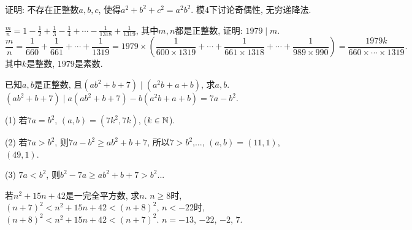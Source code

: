 \bq{}{}
证明: 不存在正整数$a,b,c$, 使得$a^{2}+b^{2}+c^{2}=a^{2}b^{2}$.
\eq
\ba
模$4$下讨论奇偶性, 无穷递降法.
\ea

 $\frac{m}{n}=1-\frac{1}{2}+\frac{1}{3}-\frac{1}{4}+\cdots-\frac{1}{1318}+\frac{1}{1319}$,
其中$m,n$都是正整数, 证明: $1979\mid m$.
\eq
\ba
\[
\frac{m}{n}=\frac{1}{660}+\frac{1}{661}+\cdots+\frac{1}{1319}=1979\times\left(\frac{1}{600\times1319}+\cdots+\frac{1}{661\times1318}+\cdots+\frac{1}{989\times990}\right)=\frac{1979k}{660\times\cdots\times1319}.
\]
其中$k$是整数, $1979$是素数.
\ea

已知$a,b$是正整数, 且$\left(ab^{2}+b+7\right)\mid\left(a^{2}b+a+b\right)$,
求$a,b$. 
\eq
\ba
$\left(ab^{2}+b+7\right)\mid a\left(ab^{2}+b+7\right)-b\left(a^{2}b+a+b\right)=7a-b^{2}$. 

(1) 若$7a=b^{2}$, $\left(a,b\right)=\left(7k^{2},7k\right)$, ($k\in\mathbb{N}$).

(2) 若$7a>b^{2}$, 则$7a-b^{2}\ge ab^{2}+b+7$, 所以$7>b^{2}$,..., $\left(a,b\right)=\left(11,1\right)$,
$\left(49,1\right)$.

(3) $7a<b^{2}$, 则$b^{2}-7a\ge ab^{2}+b+7>b^{2}$...
\ea

\bq{}{}
若$n^{2}+15n+42$是一完全平方数, 求$n$.
\eq
\ba
$n\ge8$时, $\left(n+7\right)^{2}<n^{2}+15n+42<\left(n+8\right)^{2}$,
$n<-22$时, $\left(n+8\right)^{2}<n^{2}+15n+42<\left(n+7\right)^{2}$.
$n=-13$, $-22$, $-2$, $7$.
\ea


